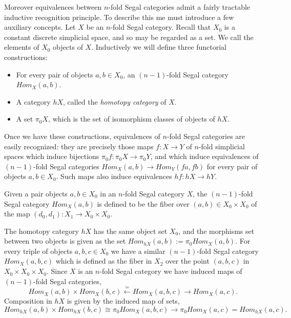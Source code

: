 \documentclass{amsart}
\begin{document}
Moreover equivalences between $n$-fold Segal categories admit a fairly tractable inductive recognition principle. To describe this me must introduce a few auxiliary concepts. Let $X$ be an $n$-fold Segal category. Recall that $X_0$ is a constant discrete simplicial space, and so may be regarded as a set. We call the elements of $X_0$ objects of $X$. 
Inductively we will define three functorial constructions:
\begin{itemize}
	\item For every pair of objects $a,b \in X_0$, an $(n-1)$-fold Segal category $Hom_X(a,b)$.
	\item A category $\mathit{h}X$, called the {\em homotopy category} of $X$.
	\item A set $\pi_0 X$, which is the set of isomorphism classes of objects of $\mathit{h}X$. 
\end{itemize}
Once we have these constructions, equivalences of $n$-fold Segal categories are easily recognized: they are precisely those maps $f:X \to Y$ of $n$-fold simplicial spaces which induce bijections $\pi_0 f: \pi_0 X \to \pi_0 Y$, 
and which induce equivalences of $(n-1)$-fold Segal categories $Hom_X(a,b) \to Hom_Y(fa, fb)$ for every pair of objects $a,b \in X_0$. Such maps also induce equivalences $\mathit{h}f:\mathit{h}X \to \mathit{h}Y$.

Given a pair objects $a,b \in X_0$ in an $n$-fold Segal category $X$, the $(n-1)$-fold Segal category $Hom_X(a,b)$ is defined to be the fiber over $(a,b) \in X_0 \times X_0$ of the map $(d_0, d_1): X_1 \to X_0 \times X_0$.  
\begin{center}
\end{center}
The homotopy category $\mathit{h}X$ has the same object set $X_0$, and the morphisms set between two objects is given as the set $Hom_{\mathit{h}X}(a,b) := \pi_0 Hom_X(a,b)$. For every triple of objects $a,b,c \in X_0$ we have a similar $(n-1)$-fold Segal category $Hom_X(a,b,c)$ which is defined as the fiber in $X_2$ over the point $(a,b,c)$ in $X_0 \times X_0 \times X_0$. Since $X$ is an $n$-fold Segal category we have induced maps of $(n-1)$-fold Segal categories,
\begin{equation*}
	Hom_X(a,b) \times Hom_X(b,c) \stackrel{\simeq}{\longleftarrow} Hom_X(a,b,c) \stackrel{}{\longrightarrow} Hom_X(a,c).
\end{equation*}
Composition in $\mathit{h}X$ is given by the induced map of sets,
\begin{equation*}
	 Hom_{\mathit{h}X}(a,b) \times Hom_{\mathit{h}X}(b,c) \cong \pi_0 Hom_X(a,b,c)\to \pi_0 Hom_X(a,c) = Hom_{\mathit{h}X}(a,c).
\end{equation*}
\end{document}
